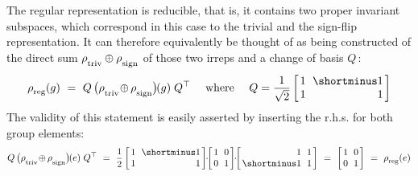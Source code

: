 The regular representation is reducible, that is, it contains two proper invariant subspaces, which correspond in this case to the trivial and the sign-flip representation.
It can therefore equivalently be thought of as being constructed of the direct sum $\rho_{\overset{}{\textup{triv}}} \oplus \rho_{\overset{}{\textup{sign}}}$ of those two irreps and a change of basis $Q$\,:
\begin{align}\label{eq:rho_reg_decomposition}
    \rhoreg(g)\ =\ Q\, \big( \rhotriv \!\oplus\mkern-1mu \rhosign \big)\mkern-2mu(g)\; Q^\top
    \quad\ \textup{where } \quad
    Q = \frac{1}{\sqrt{2}}
    \begin{bmatrix} \hspace{1.5pt}
        1 &\mkern-7mu \shortminus1 \hspace*{1.5pt} \\ \hspace{1.5pt} 1 &\mkern-7mu \phantom{\shortminus}1 \hspace*{1.5pt}
    \end{bmatrix}
\end{align}
The validity of this statement is easily asserted by inserting the r.h.s. for both group elements:
\begin{align}
    Q\, \big( \rhotriv \!\oplus\mkern-1mu \rhosign \big)\mkern-2mu(e)\; Q^\top
    \ =\ \frac{1}{2}
    \begin{bmatrix} \hspace{1.5pt}
        1 &\mkern-7mu \shortminus1 \hspace*{1.5pt} \\ \hspace{1.5pt} 1 &\mkern-7mu \phantom{\shortminus}1 \hspace*{1.5pt}
    \end{bmatrix} \mkern-6mu \cdot\mkern-6mu
    \begin{bmatrix} \hspace{1.5pt}
        1 &\mkern-7mu 0 \hspace*{1.5pt} \\ \hspace{1.5pt} 0 &\mkern-7mu 1 \hspace*{1.5pt}
    \end{bmatrix} \mkern-6mu \cdot\mkern-6mu
    \begin{bmatrix} \hspace{1.5pt}
        \phantom{\shortminus}1 &\mkern-7mu 1 \hspace*{1.5pt} \\ \hspace{1.5pt} \shortminus1 &\mkern-7mu 1 \hspace*{1.5pt}
    \end{bmatrix}
    \ =\ 
    \begin{bmatrix} \hspace{1.5pt}
        1 &\mkern-7mu 0 \hspace*{1.5pt} \\ \hspace{1.5pt} 0 &\mkern-7mu 1 \hspace*{1.5pt}
    \end{bmatrix}
    \ =\ \rhoreg(e)
\end{align}
